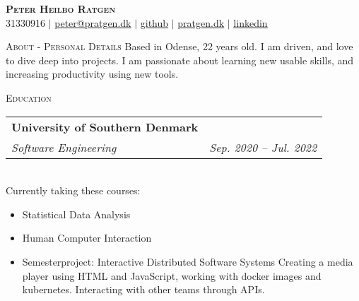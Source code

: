 \documentclass[11pt]{article}
\makeatletter
\newcommand{\resumeSubheading}[4]{
  \noindent\begin{tabular*}{0.98\textwidth}[t]{l@{\extracolsep{\fill}}r}
    \textbf{#1} & #2 \\ \vspace{-3pt} 
    \textit{\small#3} & \textit{\small #4} 
  \end{tabular*}\vspace{7pt}
}
\makeatother
\begin{document}
\begin{center}
  \textbf{\huge{\scshape{Peter Heilbo Ratgen}}}\\ 
  \vspace{0.2cm}
  \small 31330916 $|$
  \href{mailto:peter@pratgen.dk}{\underline{peter@pratgen.dk}} $|$
  \href{https://github.com/PeterRatgen }{\underline{github}} $|$
  \href{https://pratgen.dk}{\underline{pratgen.dk}} $|$
  \href{https://www.linkedin.com/in/peter-ratgen-a1236529/}{\underline{linkedin}}
\end{center}

\noindent\large{\scshape{About - Personal Details}} \newline
\noindent{\rule[0.3cm]{\textwidth}{0.4pt}}
{\normalsize Based in Odense, 22 years old. I am driven, and love to dive deep
  into projects. I am passionate about learning new usable skills, and
  increasing productivity using new tools. 
}

\vspace{0.3cm}
\noindent\large{\scshape{Education}} \newline
\noindent{\rule[0.3cm]{\textwidth}{0.4pt}}

\resumeSubheading{University of Southern Denmark}{}{Software Engineering}{Sep.
2020 -- Jul. 2022}\\\vspace{0.25cm}
{\indent\small Currently taking these courses:}
  \vspace{-0.3cm}
  {\small 
  \begin{itemize}
  \setlength{\itemsep}{-1pt}
    \item Statistical Data Analysis
    \item Human Computer Interaction
    \item Semesterproject: Interactive Distributed Software Systems
      \subitem Creating a media player using HTML and JavaScript, working with
      docker images and kubernetes. Interacting with other teams through APIs.
\end{itemize}} \vspace{0.3cm}
\end{document}
